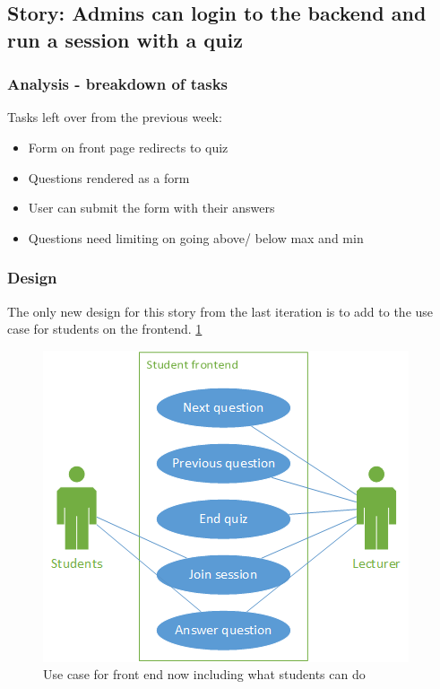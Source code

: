 \subsection{Story: Admins can login to the backend and run a session with a quiz}
\subsubsection{Analysis - breakdown of tasks}
Tasks left over from the previous week:
\begin{itemize}
	\item Form on front page redirects to quiz
	\item Questions rendered as a form
	\item User can submit the form with their answers
	\item Questions need limiting on going above/ below max and min
\end{itemize}
\subsubsection{Design}
The only new design for this story from the last iteration is to add to the use case for students on the frontend. \ref{fig:iter-5-frontend-use-case}

\begin{figure}
	\caption{Use case for front end now including what students can do}
	\centerline{\includegraphics{Chapter2/Iter-5/iter-5-frontend-use-case}}
	\label{fig:iter-5-frontend-use-case}
\end{figure}

